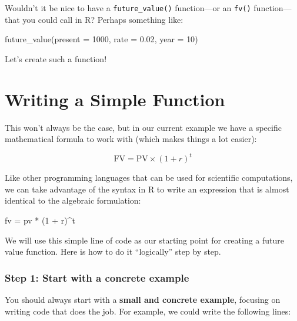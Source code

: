 \documentclass[
]{book}
\newenvironment{Shaded}{\begin{snugshade}}{\end{snugshade}}
\newcommand{\AttributeTok}[1]{\textcolor[rgb]{0.77,0.63,0.00}{#1}}
\newcommand{\DecValTok}[1]{\textcolor[rgb]{0.00,0.00,0.81}{#1}}
\newcommand{\FloatTok}[1]{\textcolor[rgb]{0.00,0.00,0.81}{#1}}
\newcommand{\FunctionTok}[1]{\textcolor[rgb]{0.00,0.00,0.00}{#1}}
\newcommand{\NormalTok}[1]{#1}
\newcommand{\OtherTok}[1]{\textcolor[rgb]{0.56,0.35,0.01}{#1}}
\newcommand{\SpecialCharTok}[1]{\textcolor[rgb]{0.00,0.00,0.00}{#1}}
\begin{document}
Wouldn't it be nice to have a \texttt{future\_value()} function---or an \texttt{fv()}
function---that you could call in R? Perhaps something like:

\begin{Shaded}
\begin{Highlighting}[]
\FunctionTok{future\_value}\NormalTok{(}\AttributeTok{present =} \DecValTok{1000}\NormalTok{, }\AttributeTok{rate =} \FloatTok{0.02}\NormalTok{, }\AttributeTok{year =} \DecValTok{10}\NormalTok{)}
\end{Highlighting}
\end{Shaded}

Let's create such a function!

\hypertarget{writing-a-simple-function}{%
\section{Writing a Simple Function}\label{writing-a-simple-function}}

This won't always be the case, but in our current example we have a specific
mathematical formula to work with (which makes things a lot easier):

\[
\text{FV} = \text{PV} \times (1 + r)^t
\]

Like other programming languages that can be used for scientific computations,
we can take advantage of the syntax in R to write an expression that is almost
identical to the algebraic formulation:

\begin{Shaded}
\begin{Highlighting}[]
\NormalTok{fv }\OtherTok{=}\NormalTok{ pv }\SpecialCharTok{*}\NormalTok{ (}\DecValTok{1} \SpecialCharTok{+}\NormalTok{ r)}\SpecialCharTok{\^{}}\NormalTok{t}
\end{Highlighting}
\end{Shaded}

We will use this simple line of code as our starting point for creating a
future value function. Here is how to do it ``logically'' step by step.

\hypertarget{step-1-start-with-a-concrete-example}{%
\subsubsection*{Step 1: Start with a concrete example}\label{step-1-start-with-a-concrete-example}}

You should always start with a \textbf{small and concrete example}, focusing
on writing code that does the job. For example, we could write the following
lines:
\end{document}
